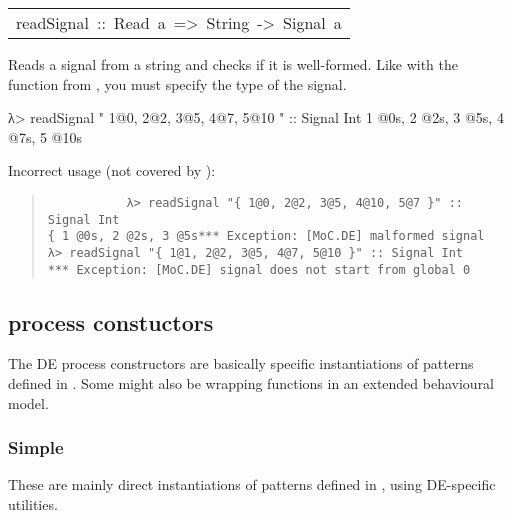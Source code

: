 \begin{haddockdesc}
\item[\begin{tabular}{@{}l}
readSignal\ ::\ Read\ a\ =>\ String\ ->\ Signal\ a
\end{tabular}]\haddockbegindoc
Reads a signal from a string and checks if it is well-formed.
 Like with the  function from , you must specify the
 type of the signal.\par
\begin{interactive}
λ> readSignal "{ 1@0, 2@2, 3@5, 4@7, 5@10 }" :: Signal Int
{ 1 @0s, 2 @2s, 3 @5s, 4 @7s, 5 @10s}

\end{interactive}Incorrect usage (not covered by ):\par
           \begin{quote}
           {\haddockverb\begin{verbatim}
           λ> readSignal "{ 1@0, 2@2, 3@5, 4@10, 5@7 }" :: Signal Int
{ 1 @0s, 2 @2s, 3 @5s*** Exception: [MoC.DE] malformed signal
λ> readSignal "{ 1@1, 2@2, 3@5, 4@7, 5@10 }" :: Signal Int
*** Exception: [MoC.DE] signal does not start from global 0\end{verbatim}}
           \end{quote}
           
\end{haddockdesc}
\subsection{ process constuctors}
The DE process constructors are basically specific
 instantiations of patterns defined in . Some
 might also be wrapping functions in an extended behavioural
 model.\par

\subsubsection{Simple}
These are mainly direct instantiations of patterns defined in
 , using DE-specific utilities.\par

